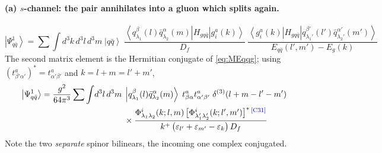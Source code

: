 \documentclass[11pt]{article}
\newcommand{\eps}{\varepsilon}
\newcommand{\dthree}{\delta^{(3)}}
\newcommand{\ket}[1]{\left|#1\right\rangle}
\newcommand{\bra}[1]{\left\langle#1\right|}
\newcommand{\Ph}{\Phi}
\newcommand{\qk}[3]{q^{#1}_{#2}(#3)}
\newcommand{\aqk}[3]{\bar q^{#1}_{#2}(#3)}
\newcommand{\gl}[3]{g^{#1}_{#2}(#3)}
\newcommand{\chg}[1]{{\color{blue!70!black}\textsuperscript{\,[C#1]}}}
\begin{document}
\paragraph{(a) $s$-channel: the pair annihilates into a gluon which splits again.}
\begin{center}
\end{center}
\begin{equation}
\ket{\Psi^{1}_{q\bar q}}=\sum\int\! d^{3}k\,d^{3}l\,d^{3}m\;\ket{q\bar q}\;
\frac{\bra{\qk{\beta}{\lambda_{1}}{l}\aqk{\alpha}{\lambda_{2}}{m}}H_{gq\bar q}\ket{\gl{a}{i}{k}}}
{D_{f}}\;
\frac{\bra{\gl{a}{i}{k}}H_{gq\bar q}\ket{\qk{\beta'}{\lambda_{1}'}{l'}\aqk{\alpha'}{\lambda_{2}'}{m'}}}
{E_{q\bar q}(l',m')-E_{g}(k)}
\end{equation}
The second matrix element is the Hermitian conjugate of \eqref{eq:MEqqg}; using
$(t^{a}_{\beta'\alpha'})^{*}=t^{a}_{\alpha'\beta'}$ and $k=l+m=l'+m'$,
\begin{align}
\ket{\Psi^{1}_{q\bar q}}=\frac{g^{2}}{64\pi^{3}}\sum\int\!d^{3}l\,d^{3}m\;
&\ket{\qk{\beta}{\lambda_{1}}{l}\aqk{\alpha}{\lambda_{2}}{m}}\;
t^{a}_{\beta\alpha}t^{a}_{\alpha'\beta'}\;\dthree(l+m-l'-m')
\nonumber\\&\times
\frac{\Ph^{i}_{\lambda_{1}\lambda_{2}}(k;l,m)\,
\big[\Ph^{i}_{\lambda_{1}'\lambda_{2}'}(k;l',m')\big]^{*}\chg{31}}
{k^{+}\,\big(\eps_{l'}+\eps_{m'}-\eps_{k}\big)\,D_{f}}
\label{eq:E1a}
\end{align}
Note the two \emph{separate} spinor bilinears, the incoming one complex conjugated.
\end{document}
